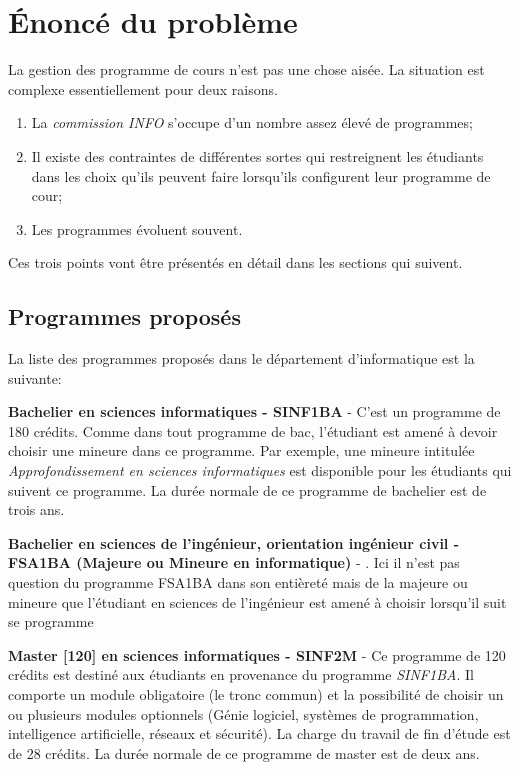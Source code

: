 \chapter{Énoncé du problème}
\label{ennonce}
La gestion des programme de cours n'est pas une chose aisée. La situation est complexe essentiellement pour deux raisons.
\begin{enumerate}
\item La \textit{commission INFO} s'occupe d'un nombre assez élevé de programmes;
\item Il existe des contraintes de différentes sortes qui restreignent les étudiants dans les choix qu'ils peuvent faire lorsqu'ils configurent leur programme de cour;
\item Les programmes évoluent souvent.
\end{enumerate}

Ces trois points vont être présentés en détail dans les sections qui suivent. 


\section{Programmes proposés}
La liste des programmes proposés dans le département d'informatique est la suivante:


\textbf{Bachelier en sciences informatiques - SINF1BA} \cite{SINF1BA} - C'est un programme de 180 crédits. Comme dans tout programme de bac, l'étudiant est amené à devoir choisir une mineure dans ce programme. Par exemple, une mineure intitulée \textit{Approfondissement en sciences informatiques} est disponible pour les étudiants qui suivent ce programme. La durée normale de ce programme de bachelier est de trois ans. 

\textbf{Bachelier en sciences de l'ingénieur, orientation ingénieur civil - FSA1BA (Majeure ou Mineure en informatique)} - \cite{FSA1BA}. Ici il n'est pas question du programme FSA1BA dans son entièreté mais de la majeure ou mineure que l'étudiant en sciences de l'ingénieur est amené à choisir lorsqu'il suit se programme

\textbf{Master [120] en sciences informatiques - SINF2M} \cite{SINF2M} - Ce programme de 120 crédits est destiné aux étudiants en provenance du programme \textit{SINF1BA}. Il comporte un module obligatoire (le tronc commun) et la possibilité de choisir un ou plusieurs modules optionnels (Génie logiciel, systèmes de programmation, intelligence artificielle, réseaux et sécurité). La charge du travail de fin d'étude est de 28 crédits. La durée normale de ce programme de master est de deux ans.

